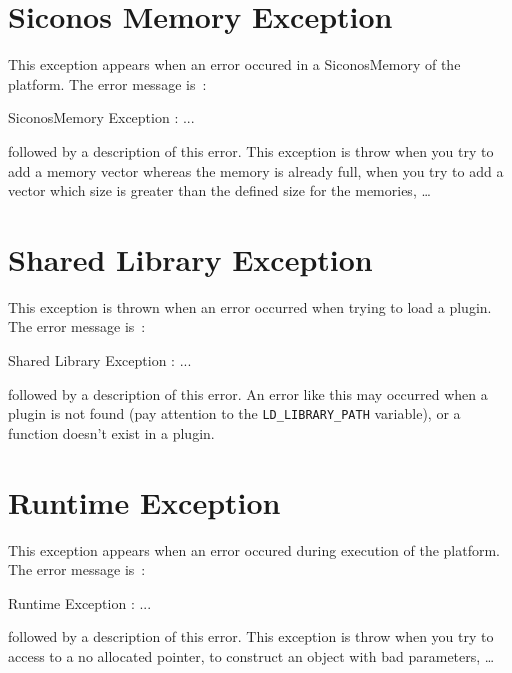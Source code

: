 \section{Siconos Memory Exception}
This exception appears when an error occured in a SiconosMemory of the platform. The error message is~: \\
\begin{minipage}{\textwidth}
\small{\textsf{SiconosMemory Exception : ...}}\\
\end{minipage}
followed by a description of this error. This exception is throw when you try to add a memory vector whereas the memory is already full, when you try  to add a vector which size
is greater than the defined size for the memories, \dots


\section{Shared Library Exception}
This exception is thrown when an error occurred when trying to load a plugin. The error message is~: \\

\begin{minipage}{\textwidth}
\small{\textsf{Shared Library Exception : ...}}\\
\end{minipage}
followed by a description of this error. An error like this may occurred when a plugin is not found (pay attention to the \verb+LD_LIBRARY_PATH+ variable), or a function doesn't exist in a plugin.

\section{Runtime Exception}
This exception appears when an error occured during execution of the platform. The error message is~: \\

\begin{minipage}{\textwidth}
\small{\textsf{Runtime Exception : ...}}\\
\end{minipage}
followed by a description of this error. This exception is throw when you try to access to a no allocated pointer, to construct an object with bad parameters, \dots
